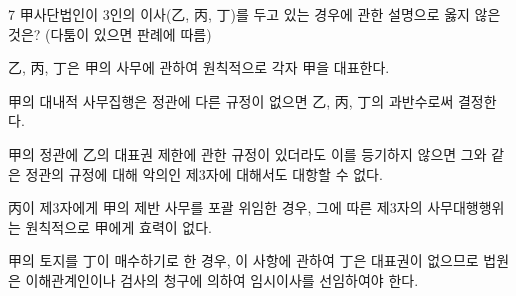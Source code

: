 \begin{question}{7}
甲사단법인이 3인의 이사(乙, 丙, 丁)를 두고 있는 경우에 관한 설명으로 옳지 않은 것은? (다툼이 있으면 판례에 따름)
\begin{choices}
  \item 乙, 丙, 丁은 甲의 사무에 관하여 원칙적으로 각자 甲을 대표한다.
  \item 甲의 대내적 사무집행은 정관에 다른 규정이 없으면 乙, 丙, 丁의 과반수로써 결정한다.
  \item 甲의 정관에 乙의 대표권 제한에 관한 규정이 있더라도 이를 등기하지 않으면 그와 같은 정관의 규정에 대해 악의인 제3자에 대해서도 대항할 수 없다.
  \item 丙이 제3자에게 甲의 제반 사무를 포괄 위임한 경우, 그에 따른 제3자의 사무대행행위는 원칙적으로 甲에게 효력이 없다.
  \item 甲의 토지를 丁이 매수하기로 한 경우, 이 사항에 관하여 丁은 대표권이 없으므로 법원은 이해관계인이나 검사의 청구에 의하여 임시이사를 선임하여야 한다.
\end{choices}
\end{question}
